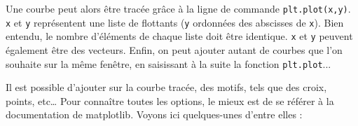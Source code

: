 \documentclass[a4paper,11pt,titlepage]{report}
\begin{document}

\vspace{5mm}
Une courbe peut alors être tracée grâce à la ligne de commande \texttt{plt.plot(x,y)}. \texttt{x} et \texttt{y} représentent une liste de flottants (\texttt{y} ordonnées des abscisses de \texttt{x}). Bien entendu, le nombre d’éléments de chaque liste doit être identique. \texttt{x} et \texttt{y} peuvent également être des vecteurs. Enfin, on peut ajouter autant de courbes que l’on souhaite sur la même fenêtre, en saisissant à la suite la fonction \texttt{plt.plot}...

\vspace{5mm}
Il est possible d’ajouter sur la courbe tracée, des motifs, tels que des croix, points, etc…
Pour connaître toutes les options, le mieux est de se référer à la documentation de matplotlib. Voyons ici quelques-unes d’entre elles :
\end{document}
